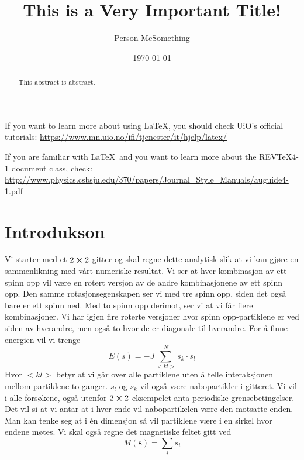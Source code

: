 \documentclass[reprint,english,notitlepage]{revtex4-2}  %
\begin{document}
\title{This is a Very Important Title!}   %
\author{Person McSomething}               %
\date{\today}                             %
\noaffiliation                            %
\begin{abstract}                          %
This abstract is abstract.                %
\end{abstract}                            %
\maketitle                                %

If you want to learn more about using \LaTeX, you should check UiO's official tutorials:
\url{https://www.mn.uio.no/ifi/tjenester/it/hjelp/latex/}

If you are familiar with \LaTeX\ and you want to learn more about the REVTeX4-1 document class, check:
\url{http://www.physics.csbsju.edu/370/papers/Journal_Style_Manuals/auguide4-1.pdf}


\section{Introdukson}



Vi starter med et $2\cross 2$ gitter og skal regne dette analytisk slik at vi kan gjøre en sammenlikning med vårt numeriske resultat. Vi ser at hver kombinasjon av ett spinn opp vil være en rotert versjon av de andre kombinasjonene av ett spinn opp. Den samme rotasjonsegenskapen ser vi med tre spinn opp, siden det også bare er ett spinn ned. Med to spinn opp derimot, ser vi at vi får flere kombinasjoner. Vi har igjen fire roterte versjoner hvor spinn opp-partiklene er ved siden av hverandre, men også to hvor de er diagonale til hverandre.
For å finne energien vil vi trenge
$$
E(s)=-J\sum_{<kl>}^N s_k \cdot s_l
$$
Hvor $<kl>$ betyr at vi går over alle partiklene uten å telle interaksjonen mellom partiklene to ganger. $s_l$ og $s_k$ vil også være nabopartikler i gitteret. Vi vil i alle forsøkene, også utenfor $2\cross 2$ eksempelet anta periodiske grensebetingelser. Det vil si at vi antar at i hver ende vil nabopartikelen være den motsatte enden. Man kan tenke seg at i én dimensjon så vil partiklene være i en sirkel hvor endene møtes.
\newline 
Vi skal også regne det magnetiske feltet gitt ved
$$
M(\mathbf{s})=\sum_i s_i
$$
\end{document}
